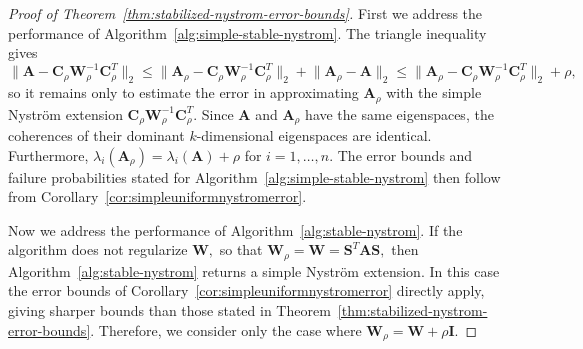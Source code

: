 \documentclass[11pt,letterpaper,twoside,reqno,nosumlimits]{amsart}
\def\transp{T}
\newcommand{\mat}[1]{\ensuremath{\mathbf{#1}}}
\newcommand{\snorm}[1]{\ensuremath{\big\|#1\big\|_2}}
\theoremstyle{remark}
\begin{document}
\begin{proof}[Proof of Theorem~\ref{thm:stabilized-nystrom-error-bounds}]
First we address the performance of Algorithm~\ref{alg:simple-stable-nystrom}. The triangle inequality gives
\[
  \snorm{\mat{A} - \mat{C}_\rho\mat{W}_\rho^{-1} \mat{C}_\rho^\transp } \leq \snorm{\mat{A}_\rho - \mat{C}_\rho\mat{W}_\rho^{-1} \mat{C}_\rho^\transp} + \snorm{\mat{A}_\rho - \mat{A}}
   \leq \snorm{\mat{A}_\rho - \mat{C}_\rho\mat{W}_\rho^{-1} \mat{C}_\rho^\transp} + \rho,
\]
so it remains only to estimate the error in approximating $\mat{A}_\rho$ with the simple Nystr\"om extension $\mat{C}_\rho\mat{W}_\rho^{-1} \mat{C}_\rho^\transp.$
Since $\mat{A}$ and $\mat{A}_\rho$ have the same eigenspaces, the coherences of their dominant $k$-dimensional eigenspaces are identical. Furthermore, $\lambda_i(\mat{A}_\rho) = \lambda_i(\mat{A}) + \rho$ for $i=1,\ldots,n.$ The error bounds and failure probabilities stated for Algorithm~\ref{alg:simple-stable-nystrom} then follow from Corollary~\ref{cor:simpleuniformnystromerror}.
 
 Now we address the performance of Algorithm~\ref{alg:stable-nystrom}. If the algorithm does not regularize $\mat{W},$ so that $\mat{W}_\rho = \mat{W} = \mat{S}^\transp \mat{A} \mat{S},$ then Algorithm~\ref{alg:stable-nystrom} returns a simple Nystr\"om extension. In this case the error bounds of Corollary~\ref{cor:simpleuniformnystromerror} directly apply, giving sharper bounds than those stated in Theorem~\ref{thm:stabilized-nystrom-error-bounds}. Therefore, we consider only the case where $\mat{W}_\rho = \mat{W} + \rho \mat{I}.$ 


\end{proof}
\end{document}
